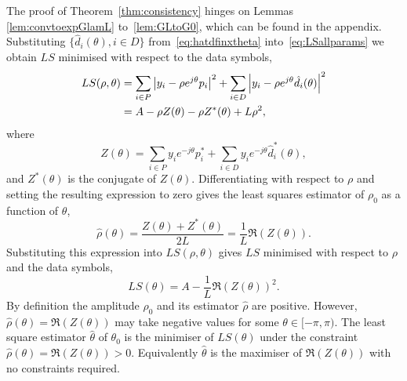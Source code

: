 \documentclass[journal]{IEEEtran}
\begin{document}
The proof of Theorem~\ref{thm:consistency} hinges on Lemmas \ref{lem:convtoexpGlamL} to~\ref{lem:GLtoG0}, which can be found in the appendix.
Substituting $\{ \hat{d}_i(\theta), i \in D \}$ from~\eqref{eq:hatdfinxtheta} into~\eqref{eq:LSallparams} we obtain $LS$ minimised with respect to the data symbols,
 \begin{align*}
LS(\rho, \theta) &=\sum_{i \in P} {\left\vert  y_i - \rho e^{j\theta} p_i  \right\vert}^2 + \sum_{i \in D} {\left\vert  y_i - \rho e^{j\theta} \hat{d_i}(\theta)  \right\vert}^2 \\
&= A - \rho Z(\theta) - \rho Z^*(\theta) + L \rho^2,
\end{align*}
where
\[
Z(\theta)  = \sum_{i \in P} y_i e^{-j\theta} p_i^* + \sum_{i \in D} y_i e^{-j\theta} \hat{d}_i^*(\theta),
\]
and $Z^*(\theta)$ is the conjugate of $Z(\theta)$.  Differentiating with respect to $\rho$ and setting the resulting expression to zero gives the least squares estimator of $\rho_0$ as a function of $\theta$,
\begin{equation}\label{eq:hatrhoZ}
\hat{\rho}(\theta) = \frac{Z(\theta) + Z^*(\theta)}{2L} = \frac{1}{L}\Re(Z(\theta)).
\end{equation}
Substituting this expression into $LS(\rho, \theta)$ gives $LS$ minimised with respect to $\rho$ and the data symbols,
\[
LS(\theta) = A - \frac{1}{L}\Re(Z(\theta))^2.
\]
By definition the amplitude $\rho_0$ and its estimator $\hat{\rho}$ are positive.  However, $\hat{\rho}(\theta) = \Re(Z(\theta))$ may take negative values for some $\theta \in [-\pi,\pi)$.  %
The least square estimator $\hat{\theta}$ of $\theta_0$ is the minimiser of $LS(\theta)$ under the constraint $\hat{\rho}(\theta) = \Re(Z(\theta)) > 0$.  Equivalently $\hat{\theta}$ is the maximiser of $\Re(Z(\theta))$ with no constraints required.
 
\end{document}
